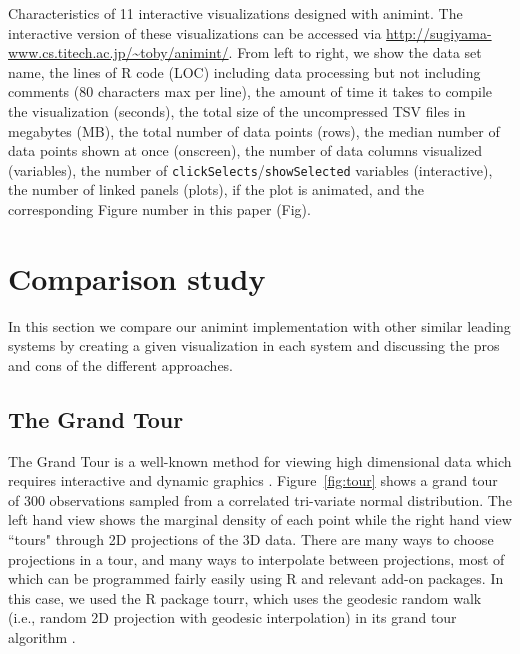 \documentclass[12pt]{article}\usepackage[]{graphicx}\usepackage[]{color}
\begin{document}
\begin{table}[htp] %
  \centering
  
  \vskip 0.2cm
  \caption{Characteristics of 11 interactive visualizations designed with
    animint. The interactive version of these visualizations can be accessed 
    via \url{http://sugiyama-www.cs.titech.ac.jp/~toby/animint/}.
    From left to right, we show the data set name, the
    lines of R code (LOC) including data processing but not including comments
    (80 characters max per line),
    the amount of time it takes to compile the visualization (seconds),
    the total size of the uncompressed TSV files in megabytes (MB),
    the total number of data points (rows),
    the median number of data points shown at once (onscreen),
    the number of data columns visualized (variables),
    the number of \texttt{clickSelects}/\texttt{showSelected} 
    variables (interactive),
    the number of linked panels (plots),
    if the plot is animated,
    and the corresponding Figure number in this paper (Fig).
  }
\label{tab:examples}
\end{table}

\section{Comparison study}
\label{sec:compare}

In this section we compare our animint implementation with other similar
leading systems by creating a given visualization in each system and
discussing the pros and cons of the different approaches.

\subsection{The Grand Tour}
\label{sec:tour}

The Grand Tour is a well-known method for viewing high dimensional data which
requires interactive and dynamic graphics \citep{grand-tour}. 
Figure~\ref{fig:tour} shows a grand tour of 300 observations sampled
from a correlated tri-variate normal distribution. The left hand view
shows the marginal density of each point while the right hand view ``tours"
through 2D projections of the 3D data. There are many ways to
choose projections in a tour, and many ways to interpolate
between projections, most of which can be programmed fairly easily
using R and relevant add-on packages. In this case, we used the R package tourr,
which uses the geodesic random walk (i.e., random 2D projection with geodesic
interpolation) in its grand tour algorithm \citep{tourr}.
\end{document}
